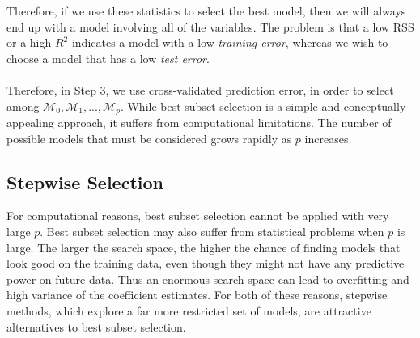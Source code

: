 Therefore, if we use these statistics to select the best model, then we will
always end up with a model involving all of the variables. The problem is
that a low RSS or a high $R^2$ indicates a model with a low \textit{training error}, whereas we wish to choose a model that has a low \textit{test error}.
\\\\
Therefore, in Step 3, we use cross-validated prediction error, in order to select among $\mathcal{M}_0, \mathcal{M}_1, ..., \mathcal{M}_p$. While best subset selection is a simple and conceptually appealing approach, it suffers from computational limitations. The number of possible models that must be considered grows rapidly as $p$ increases.

\subsection{Stepwise Selection}
For computational reasons, best subset selection cannot be applied with
very large $p$. Best subset selection may also suffer from statistical problems when $p$ is large. The larger the search space, the higher the chance of finding models that look good on the training data, even though they might not have any predictive power on future data. Thus an enormous search space can lead to overfitting and high variance of the coefficient estimates. For both of these reasons, stepwise methods, which explore a far more restricted set of models, are attractive alternatives to best subset selection.
